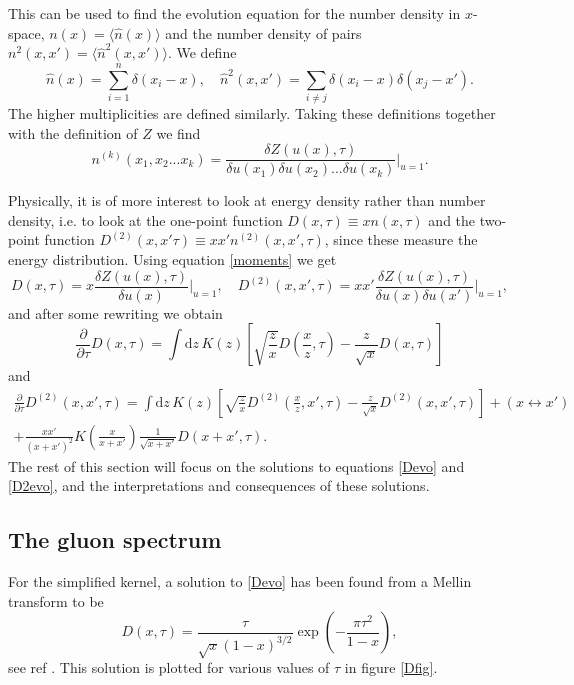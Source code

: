 \documentclass[a4paper,12pt]{article}
\newcommand{\party}[2]{\frac{\partial{#1}}{\partial{#2}}}
\numberwithin{equation}{section}
\begin{document}
This can be used to find the evolution equation for the number density in $x$-space,  $n(x)=\langle \hat{n} (x)\rangle$ and the number density of pairs $n^2(x,x') = \langle \hat{n}^2(x,x') \rangle $. We define 
\begin{equation}
\hat{n}(x)=\sum_{i=1}^n \delta(x_i-x), \quad \hat{n}^2(x,x')=\sum_{i \neq j} \delta(x_i-x)\delta(x_j-x').
\end{equation}
The higher multiplicities are defined similarly. Taking these definitions together with the definition of $Z$ we find
\begin{equation}\label{moments}
n^{(k)}(x_1,x_2...x_k)=\frac{\delta Z(u(x),\tau)}{\delta u(x_1)\delta u(x_2)...\delta u(x_k)}\Bigg|_{u=1}.
\end{equation}

Physically, it is of more interest to look at energy density rather than number density, i.e. to look at the one-point function $D(x,\tau)\equiv xn(x,\tau)$ and the two-point function $D^{(2)}(x,x'\tau)\equiv xx'n^{(2)}(x,x',\tau)$, since these measure the energy distribution. Using equation \eqref{moments} we get
\begin{equation}
D(x,\tau)=x \frac{\delta Z(u(x),\tau)}{\delta u(x)}\Bigg|_{u=1},\quad D^{(2)}(x,x',\tau)=xx' \frac{\delta Z(u(x),\tau)}{\delta u(x)\delta u(x')}\Bigg|_{u=1},
\end{equation}
and after some rewriting we obtain
\begin{equation}\label{Devo}
\party{}{\tau}D(x,\tau)=\int \mathrm{d}z\, K(z) \left[\sqrt{\frac{z}{x}} D\left(\frac{x}{z},\tau\right)- \frac{z}{\sqrt{x}}D(x,\tau)  \right]
\end{equation}
and
\begin{multline}\label{D2evo}
\party{}{\tau}D^{(2)}(x,x',\tau)=\int \mathrm{d}z\, K(z) \left[ \sqrt{\frac{z}{x}} D^{(2)}\left(\frac{x}{z},x',\tau\right) - \frac{z}{\sqrt{x}} D^{(2)}(x,x',\tau)\right]+(x \leftrightarrow x') \\
+ \frac{xx'}{(x+x')^2} K\left(\frac{x}{x+x'}\right) \frac{1}{\sqrt{x+x'}} D(x+x',\tau).
\end{multline}
The rest of this section will focus on the solutions to equations \eqref{Devo} and \eqref{D2evo}, and the interpretations and consequences of these solutions.

\subsection{The gluon spectrum}\label{onepoint}
For the simplified kernel, a solution to \eqref{Devo} has been found from a Mellin transform to be
\begin{equation}\label{Mellin}
D(x,\tau) = \frac{\tau}{\sqrt{x}(1-x)^{3/2}}\exp\left(-\frac{\pi \tau^2}{1-x}\right),
\end{equation}
see ref \cite{Blaizot:2013hx}. This solution is plotted for various values of $\tau$ in figure \ref{Dfig}.
\end{document}
